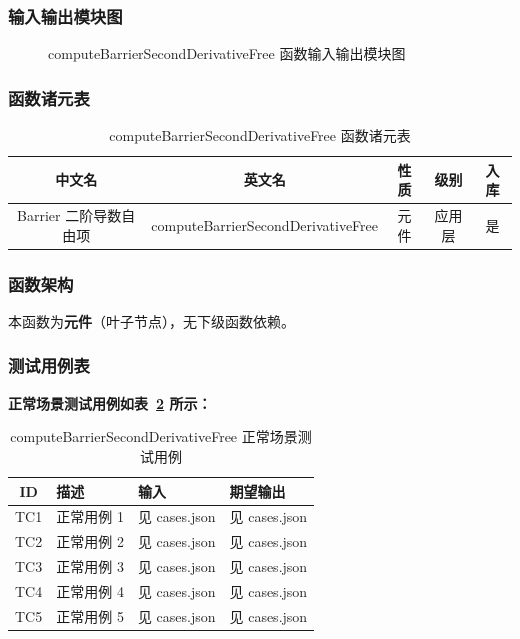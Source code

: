 \documentclass[a4paper,10pt]{article}
\begin{document}
\subsubsection{输入输出模块图}
\begin{figure}[h]
    \centering
    \caption{computeBarrierSecondDerivativeFree 函数输入输出模块图}
    \label{fig:io_computeBarrierSecondDerivativeFree}
\end{figure}
\subsubsection{函数诸元表}
\begin{table}[h]
    \centering
    \caption{computeBarrierSecondDerivativeFree 函数诸元表}
    \label{tab:meta_computeBarrierSecondDerivativeFree}
    \begin{tabular}{|c|c|c|c|c|}
        \hline
        中文名 & 英文名 & 性质 & 级别 & 入库 \\ \hline
        Barrier 二阶导数自由项 & computeBarrierSecondDerivativeFree & 元件 & 应用层 & 是 \\ \hline
    \end{tabular}
\end{table}
\subsubsection{函数架构}
\par 本函数为\textbf{元件}（叶子节点），无下级函数依赖。

\subsubsection{测试用例表}
\noindent\textbf{正常场景测试用例如表~\ref{tab:normal_computeBarrierSecondDerivativeFree} 所示：}
\begin{table}[h]
\centering
\caption{computeBarrierSecondDerivativeFree 正常场景测试用例}
\label{tab:normal_computeBarrierSecondDerivativeFree}
\begin{tabular}{|c|p{3.5cm}|p{3.5cm}|p{3.5cm}|}
\hline
ID & 描述 & 输入 & 期望输出 \\ \hline
  TC1 & 正常用例 1 & 见 cases.json & 见 cases.json \\ \hline
  TC2 & 正常用例 2 & 见 cases.json & 见 cases.json \\ \hline
  TC3 & 正常用例 3 & 见 cases.json & 见 cases.json \\ \hline
  TC4 & 正常用例 4 & 见 cases.json & 见 cases.json \\ \hline
  TC5 & 正常用例 5 & 见 cases.json & 见 cases.json \\ \hline
\end{tabular}
\end{table}
\end{document}

